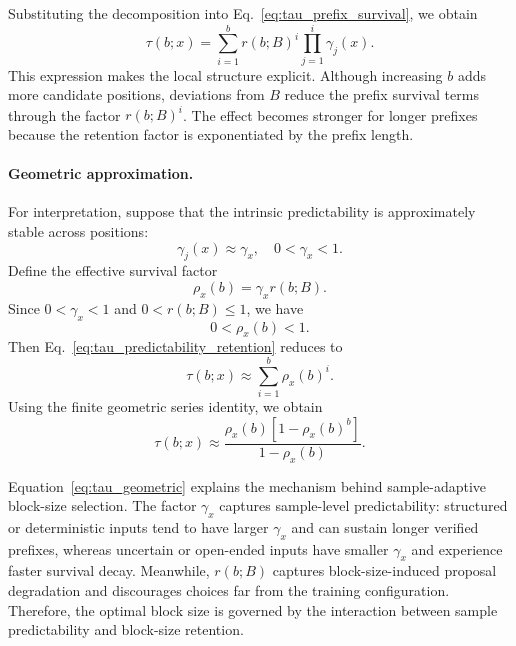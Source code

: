 \documentclass{llmxive}
\begin{document}
Substituting the decomposition into Eq.~\eqref{eq:tau_prefix_survival}, we obtain
\begin{equation}
\label{eq:tau_predictability_retention}
\tau(b;x)
=
\sum_{i=1}^{b}
r(b;B)^i
\prod_{j=1}^{i}
\gamma_j(x).
\end{equation}
This expression makes the local structure explicit. Although increasing $b$ adds more candidate positions, deviations from $B$ reduce the prefix survival terms through the factor $r(b;B)^i$. The effect becomes stronger for longer prefixes because the retention factor is exponentiated by the prefix length.

\paragraph{Geometric approximation.}
For interpretation, suppose that the intrinsic predictability is approximately stable across positions:
\begin{equation}
\gamma_j(x)\approx \gamma_x,
\quad
0<\gamma_x<1.
\end{equation}
Define the effective survival factor
\begin{equation}
\rho_x(b)
=
\gamma_x r(b;B).
\end{equation}
Since $0<\gamma_x<1$ and $0<r(b;B)\le 1$, we have
\begin{equation}
0<\rho_x(b)<1.
\end{equation}
Then Eq.~\eqref{eq:tau_predictability_retention} reduces to
\begin{equation}
\tau(b;x)
\approx
\sum_{i=1}^{b}
\rho_x(b)^i.
\end{equation}
Using the finite geometric series identity, we obtain
\begin{equation}
\label{eq:tau_geometric}
\tau(b;x)
\approx
\frac{
\rho_x(b)
\left[
1-\rho_x(b)^b
\right]
}{
1-\rho_x(b)
}.
\end{equation}

Equation~\eqref{eq:tau_geometric} explains the mechanism behind sample-adaptive block-size selection. The factor $\gamma_x$ captures sample-level predictability: structured or deterministic inputs tend to have larger $\gamma_x$ and can sustain longer verified prefixes, whereas uncertain or open-ended inputs have smaller $\gamma_x$ and experience faster survival decay. Meanwhile, $r(b;B)$ captures block-size-induced proposal degradation and discourages choices far from the training configuration. Therefore, the optimal block size is governed by the interaction between sample predictability and block-size retention.
\end{document}
